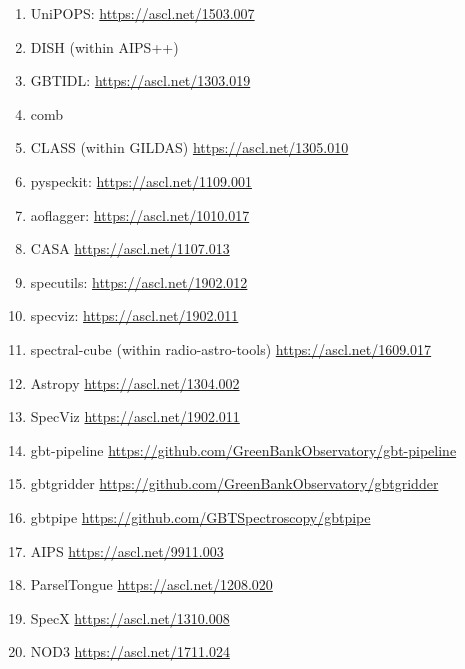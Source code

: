 \documentclass[12pt,a4paper]{article}
\begin{document}
\begin{enumerate}
\item UniPOPS: \url{https://ascl.net/1503.007}
\item DISH (within AIPS++)
\item GBTIDL: \url{https://ascl.net/1303.019}
\item comb
\item CLASS (within GILDAS) \url{https://ascl.net/1305.010}
\item pyspeckit: \url{https://ascl.net/1109.001}
\item aoflagger: \url{https://ascl.net/1010.017}
\item CASA \url{https://ascl.net/1107.013}
\item specutils: \url{https://ascl.net/1902.012}
\item specviz: \url{https://ascl.net/1902.011}
\item spectral-cube (within radio-astro-tools) \url{https://ascl.net/1609.017}
\item Astropy \url{https://ascl.net/1304.002}
\item SpecViz \url{https://ascl.net/1902.011}
\item gbt-pipeline \url{https://github.com/GreenBankObservatory/gbt-pipeline}
\item gbtgridder \url{https://github.com/GreenBankObservatory/gbtgridder}
\item gbtpipe \url{https://github.com/GBTSpectroscopy/gbtpipe}
\item AIPS \url{https://ascl.net/9911.003}
\item ParselTongue \url{https://ascl.net/1208.020}
\item SpecX \url{https://ascl.net/1310.008}
\item NOD3 \url{https://ascl.net/1711.024}

\end{enumerate}



\end{document}

